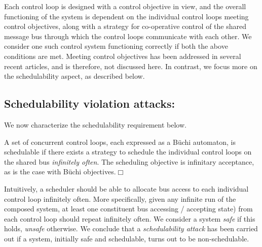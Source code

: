 \noindent
Each control loop is designed with a control objective in view, and the overall functioning of the system is dependent on the individual control loops meeting control objectives, along with a strategy for co-operative control of the shared message bus through which the control loops communicate with each other. We consider one such control system functioning correctly if both the above conditions are met. Meeting control objectives has been addressed in several recent articles, and is therefore, not discussed here. In contrast, we focus more on the schedulability aspect, as described below. 

\subsection{Schedulability violation attacks:} 
\noindent
We now characterize the schedulability requirement below. 

\begin{definition}
A set of concurrent control loops, each expressed as a B\"{u}chi automaton, is schedulable if there exists a strategy to schedule the individual control loops on the shared bus {\em infinitely often}.
The scheduling objective is infinitary acceptance, as is the case with B\"{u}chi objectives.$\Box$ \\
\end{definition}

\noindent
Intuitively, a scheduler should be able to allocate bus access to each individual control loop infinitely often. More specifically, given any infinite run of the composed system, at least one constituent  bus accessing / accepting state) from each control loop should repeat infinitely often. We consider a system {\em safe} if this holds, {\em unsafe} otherwise. 
We conclude that a {\em schedulability attack} has been carried out if a system,  initially safe and schedulable, turns out to be non-schedulable. \\
%

